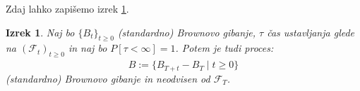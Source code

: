 \documentclass[11pt]{article}
\newcommand{\f}{\mathcal{F}}
\theoremstyle{definition}
\theoremstyle{plain}
\newtheorem{izrek}{Izrek}
\begin{document}
    Zdaj lahko zapišemo izrek \ref{thm:stopped_brownian}. %
    

\begin{izrek}
        Naj bo $\{B_t\}_{t \geq 0}$ (standardno) Brownovo gibanje, $\tau$ čas ustavljanja glede na 
        $(\f_t)_{t \geq 0}$ in naj bo $P[\tau < \infty]=1$.
        Potem je tudi proces:
        \[
        \hat{B} := \{B_{T+t} - B_T \mid t \geq 0\}
        \]
        (standardno) Brownovo gibanje in neodvisen od $\f_T$.
    \label{thm:stopped_brownian}
\end{izrek}
    


\end{document}
